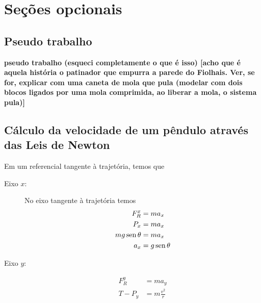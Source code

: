 \section{Seções opcionais}

\subsection{Pseudo trabalho}

\textbf{pseudo trabalho (esqueci completamente o que é isso) [acho que é aquela história o patinador que empurra a parede do Fiolhais. Ver, se for, explicar com uma caneta de mola que pula (modelar com dois blocos ligados por uma mola comprimida, ao liberar a mola, o sistema pula)]}


\subsection{Cálculo da velocidade de um pêndulo através das Leis de Newton}

Em um referencial tangente à trajetória, temos que
\begin{description}
    \item[Eixo $x$:] No eixo tangente à trajetória temos
        \begin{align}
            F_R^x &= m a_x \\
            P_x &= m a_x \\
            mg \operatorname{sen}\theta &= m a_x \\
            a_x &= g \operatorname{sen}\theta
        \end{align}
    \item[Eixo $y$:]
        \begin{align}
            F_R^y &= m a_y \\
            T - P_y &= m \frac{v^2}{r}
        \end{align}
\end{description}

